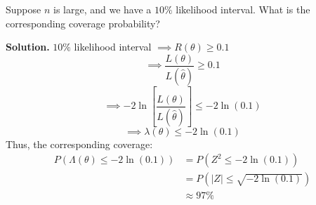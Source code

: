 \begin{exbox}
    \begin{example}
        Suppose $ n $ is large, and we have a $ 10\% $ likelihood interval. What is the corresponding
        coverage probability?

        \textbf{Solution.} $ 10\% $ likelihood interval $ \implies R(\theta)\geqslant 0.1 $
        \[ \implies \frac{L(\theta)}{L(\hat{\theta})}\geqslant 0.1  \]
        \[ \implies -2\ln\left[  \frac{L(\theta)}{L(\hat{\theta})} \right]\leqslant -2\ln(0.1)  \]
        \[ \implies \lambda(\theta)\leqslant -2\ln(0.1) \]
        Thus, the corresponding coverage:
        \begin{align*}
            P(\Lambda(\theta)\leqslant -2\ln(0.1))
             & = P(Z^2\leqslant -2\ln(0.1))        \\
             & = P(|Z|\leqslant \sqrt{-2\ln(0.1)}) \\
             & \approx 97\%
        \end{align*}
    \end{example}
\end{exbox}
